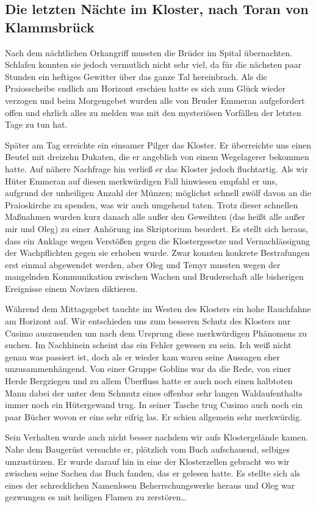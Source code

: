 \subsection{Die letzten Nächte im Kloster, nach Toran von Klammsbrück}

Nach dem nächtlichen Orkangriff mussten die Brüder im Spital übernachten. Schlafen konnten sie jedoch vermutlich nicht sehr viel, da für die nächsten paar Stunden ein heftiges Gewitter über das ganze Tal hereinbrach. Als die Praiosscheibe endlich am Horizont erschien hatte es sich zum Glück wieder verzogen und beim Morgengebet wurden alle von Bruder Emmeran aufgefordert offen und ehrlich alles zu melden was mit den mysteriösen Vorfällen der letzten Tage zu tun hat.\par
Später am Tag erreichte ein einsamer Pilger das Kloster. Er überreichte uns einen Beutel mit dreizehn Dukaten, die er angeblich von einem Wegelagerer bekommen hatte. Auf nähere Nachfrage hin verließ er das Kloster jedoch fluchtartig. Als wir Hüter Emmeran auf diesen merkwürdigen Fall hinwiesen empfahl er uns, aufgrund der unheiligen Anzahl der Münzen; möglichst schnell zwölf davon an die Praioskirche zu spenden, was wir auch umgehend taten.
Trotz dieser schnellen Maßnahmen wurden kurz danach alle außer den Geweihten (das heißt alle außer mir und Oleg) zu einer Anhörung ins Skriptorium beordert. Es stellt sich heraus, dass ein Anklage wegen Verstößen gegen die Klostergesetze und Vernachlässigung der Wachpflichten gegen sie erhoben wurde. Zwar konnten konkrete Bestrafungen erst einmal abgewendet werden, aber Oleg und Temyr mussten wegen der mangelnden Kommunikation zwischen Wachen und Bruderschaft alle bisherigen Ereignisse einem Novizen diktieren.\par
Während dem Mittagsgebet tauchte im Westen des Klosters ein hohe Rauchfahne am Horizont auf. Wir entschieden uns zum besseren Schutz des Klosters nur Cusimo auszusenden um nach dem Ursprung diese merkwürdigen Phänomens zu suchen. Im Nachhinein scheint das ein Fehler gewesen zu sein. Ich weiß nicht genau was passiert ist, doch als er wieder kam waren seine Aussagen eher unzusammenhängend. Von einer Gruppe Goblins war da die Rede, von einer Herde Bergziegen und zu allem Überfluss hatte er auch noch einen halbtoten Mann dabei der unter dem Schmutz eines offenbar sehr langen Waldaufenthalts immer noch ein Hütergewand trug. In seiner Tasche trug Cusimo auch noch ein paar Bücher wovon er eins sehr eifrig las. Er schien allgemein sehr merkwürdig.\par
Sein Verhalten wurde auch nicht besser nachdem wir aufs Klostergelände kamen. Nahe dem Baugerüst versuchte er, plötzlich vom Buch aufschauend, selbiges umzustürzen. Er wurde darauf hin in eine der Klosterzellen gebracht wo wir zwischen seine Sachen das Buch fanden, das er gelesen hatte. Es stellte sich als eines der schrecklichen Namenlosen Beherrschungswerke heraus und Oleg war gezwungen es mit heiligen Flamen zu zerstören\dots 

